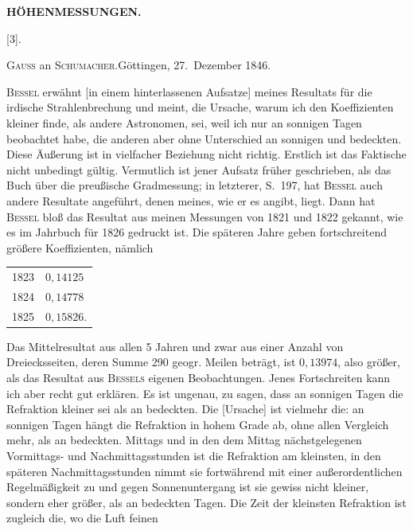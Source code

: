 \par\clearpage
\noindent\null\hfill{\small\textbf{HÖHENMESSUNGEN.}}\hfill{}\par\medskip
\begin{center}
[3].\par{}\par\bigskip
\textsc{Gauss} an \textsc{Schumacher}.\quad Göttingen, 27.~Dezember 1846.
\end{center}
\par\noindent\hspace*{\parindent}\textsc{Bessel} erwähnt [in einem hinterlassenen Aufsatze] meines Resultats für
die irdische Strahlenbrechung und meint, die Ursache, warum ich den Koeffizienten kleiner finde, als andere Astronomen, sei, weil ich nur an sonnigen
Tagen beobachtet habe, die anderen aber ohne Unterschied an sonnigen und
bedeckten. Diese Äußerung ist in vielfacher Beziehung nicht richtig. Erstlich ist das Faktische nicht unbedingt gültig. Vermutlich ist jener Aufsatz
früher geschrieben, als das Buch über die preußische Gradmessung; in letzterer, S.~197, hat \textsc{Bessel} auch andere Resultate angeführt,  denen
meines, wie er es angibt, liegt. Dann hat \textsc{Bessel} bloß das Resultat aus
meinen Messungen von 1821 und 1822 gekannt, wie es im Jahrbuch für 1826
gedruckt ist. Die späteren Jahre geben fortschreitend größere Koeffizienten,
nämlich
\begin{center}
\begin{tabular}{r@{\ .\ .\ .\ }l}
1823&\(0{,}14125\)\\
1824&\(0{,}14778\)\\
1825&\(0{,}15826\).
\end{tabular}
\end{center}
\par\noindent\hspace*{\parindent}Das Mittelresultat aus allen 5 Jahren und zwar aus einer Anzahl von
Dreiecksseiten, deren Summe 290 geogr. Meilen beträgt, ist \(0{,}13974\), also
größer, als das Resultat aus \textsc{Bessels} eigenen Beobachtungen. Jenes Fortschreiten kann ich aber recht gut erklären. Es ist ungenau, zu sagen, dass
an sonnigen Tagen die Refraktion kleiner sei als an bedeckten. Die [Ursache]
ist vielmehr die: an sonnigen Tagen hängt die Refraktion in hohem Grade  ab, ohne allen Vergleich mehr, als an bedeckten. Mittags und
in den dem Mittag nächstgelegenen Vormittags- und Nachmittagsstunden ist die
Refraktion am kleinsten, in den späteren Nachmittagsstunden nimmt sie fortwährend mit einer außerordentlichen Regelmäßigkeit zu und gegen Sonnenuntergang ist sie gewiss nicht kleiner, sondern eher größer, als an bedeckten
Tagen. Die Zeit der kleinsten Refraktion ist zugleich die, wo die Luft feinen
\par\medskip\noindent\null\hfill\makebox[0.18\linewidth][l]{56\textsuperscript{*}}\par

